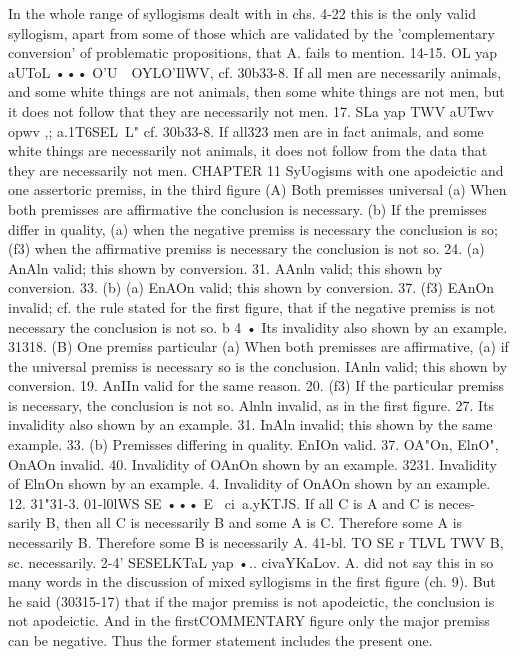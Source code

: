 {{{In the whole range of syllogisms dealt with in chs. 4-22 this
is the only valid syllogism, apart from some of those which are
validated by the 'complementary conversion' of problematic
propositions, that A. fails to mention.
14-15. OL yap aUToL ••• O'U~~OYLO'IlWV, cf. 30b33-8. If all men
are necessarily animals, and some white things are not animals,
then some white things are not men, but it does not follow that
they are necessarily not men.
17. SLa yap TWV aUTwv opwv ,; a.1T6SEL~L" cf. 30b33-8. If all323
men are in fact animals, and some white things are necessarily not
animals, it does not follow from the data that they are necessarily
not men.
CHAPTER 11
SyUogisms with one apodeictic and one assertoric premiss, in the
third figure
(A) Both premisses universal
(a) When both premisses are affirmative the conclusion is
necessary. (b) If the premisses differ in quality, (a) when the
negative premiss is necessary the conclusion is so; (f3) when the
affirmative premiss is necessary the conclusion is not so.
24. (a) AnAln valid; this shown by conversion.
31. AAnln valid; this shown by conversion.
33. (b) (a) EnAOn valid; this shown by conversion.
37. (f3) EAnOn invalid; cf. the rule stated for the first figure,
that if the negative premiss is not necessary the conclusion is
not so.
b 4 • Its invalidity also shown by an example.
31318.
(B) One premiss particular
(a) When both premisses are affirmative, (a) if the universal
premiss is necessary so is the conclusion. IAnln valid; this shown
by conversion.
19. AnIIn valid for the same reason.
20. (f3) If the particular premiss is necessary, the conclusion is
not so. Alnln invalid, as in the first figure.
27. Its invalidity also shown by an example.
31. InAln invalid; this shown by the same example.
33. (b) Premisses differing in quality. EnIOn valid.
37. OA"On, ElnO", OnAOn invalid.
40. Invalidity of OAnOn shown by an example.
3231. Invalidity of ElnOn shown by an example.
4. Invalidity of OnAOn shown by an example.
12.
31"31-3. 01-l0lWS SE ••• E~ ci~a.yKTJS. If all C is A and C is neces-
sarily B, then all C is necessarily B and some A is C. Therefore
some A is necessarily B. Therefore some B is necessarily A.
41-bl. TO SE r TLVL TWV B, sc. necessarily.
2-4' SESELKTaL yap •.. civaYKaLov. A. did not say this in so
many words in the discussion of mixed syllogisms in the first
figure (ch. 9). But he said (30315-17) that if the major premiss is
not apodeictic, the conclusion is not apodeictic. And in the firstCOMMENTARY
figure only the major premiss can be negative. Thus the former
statement includes the present one.
}}}
